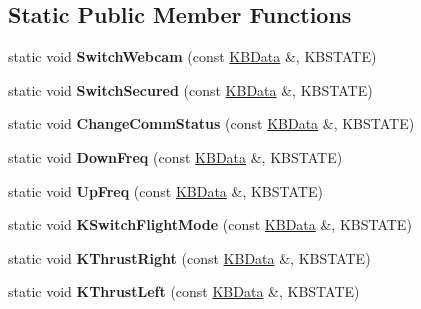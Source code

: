 \subsection*{Static Public Member Functions}
\begin{DoxyCompactItemize}
\item 
static void {\bfseries Switch\+Webcam} (const \hyperlink{classKBData}{K\+B\+Data} \&, K\+B\+S\+T\+A\+TE)\hypertarget{classFlyByKeyboard_aa6438bc437864f02b6cbae872ca40a07}{}\label{classFlyByKeyboard_aa6438bc437864f02b6cbae872ca40a07}

\item 
static void {\bfseries Switch\+Secured} (const \hyperlink{classKBData}{K\+B\+Data} \&, K\+B\+S\+T\+A\+TE)\hypertarget{classFlyByKeyboard_ad199158c4b93d327aac8ab7e795ddf18}{}\label{classFlyByKeyboard_ad199158c4b93d327aac8ab7e795ddf18}

\item 
static void {\bfseries Change\+Comm\+Status} (const \hyperlink{classKBData}{K\+B\+Data} \&, K\+B\+S\+T\+A\+TE)\hypertarget{classFlyByKeyboard_ae99257b7374caf42a37f542baf4c91e7}{}\label{classFlyByKeyboard_ae99257b7374caf42a37f542baf4c91e7}

\item 
static void {\bfseries Down\+Freq} (const \hyperlink{classKBData}{K\+B\+Data} \&, K\+B\+S\+T\+A\+TE)\hypertarget{classFlyByKeyboard_afad18668d5496d7a6f8bfae6fc3b11ca}{}\label{classFlyByKeyboard_afad18668d5496d7a6f8bfae6fc3b11ca}

\item 
static void {\bfseries Up\+Freq} (const \hyperlink{classKBData}{K\+B\+Data} \&, K\+B\+S\+T\+A\+TE)\hypertarget{classFlyByKeyboard_a5e6dcc9d2c4a4c9f9a7db68271f9104c}{}\label{classFlyByKeyboard_a5e6dcc9d2c4a4c9f9a7db68271f9104c}

\item 
static void {\bfseries K\+Switch\+Flight\+Mode} (const \hyperlink{classKBData}{K\+B\+Data} \&, K\+B\+S\+T\+A\+TE)\hypertarget{classFlyByKeyboard_a8538c583523ddb5fcec025928a4e58ab}{}\label{classFlyByKeyboard_a8538c583523ddb5fcec025928a4e58ab}

\item 
static void {\bfseries K\+Thrust\+Right} (const \hyperlink{classKBData}{K\+B\+Data} \&, K\+B\+S\+T\+A\+TE)\hypertarget{classFlyByKeyboard_af6049531aa7decca493b9188d12c1ef5}{}\label{classFlyByKeyboard_af6049531aa7decca493b9188d12c1ef5}

\item 
static void {\bfseries K\+Thrust\+Left} (const \hyperlink{classKBData}{K\+B\+Data} \&, K\+B\+S\+T\+A\+TE)\hypertarget{classFlyByKeyboard_ad9720e6e41828a80f9d27f1a79becf75}{}\label{classFlyByKeyboard_ad9720e6e41828a80f9d27f1a79becf75}


\end{DoxyCompactItemize}

